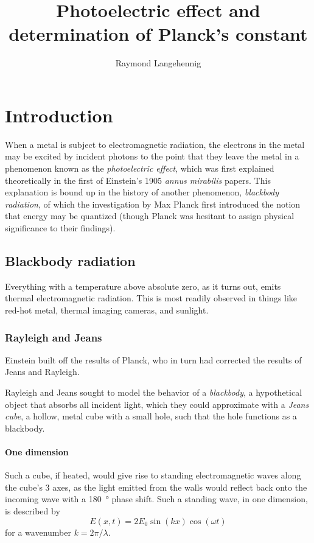 \documentclass{article}
\title{Photoelectric effect and determination of Planck's constant}
\author{Raymond Langehennig}
\begin{document}
\maketitle

\section{Introduction}
When a metal is subject to electromagnetic radiation, the electrons in the metal may be excited by incident photons to the point that they leave the metal in a phenomenon known as the \emph{photoelectric effect}, which was first explained theoretically in the first of Einstein's 1905 \textit{annus mirabilis} papers. This explanation is bound up in the history of another phenomenon, \emph{blackbody radiation}, of which the investigation by Max Planck first introduced the notion that energy may be quantized (though Planck was hesitant to assign physical significance to their findings).


\subsection{Blackbody radiation}
Everything with a temperature above absolute zero, as it turns out, emits thermal electromagnetic radiation. This is most readily observed in things like red-hot metal, thermal imaging cameras, and sunlight.

\subsubsection{Rayleigh and Jeans}
Einstein built off the results of Planck, who in turn had corrected the results of Jeans and Rayleigh.

Rayleigh and Jeans sought to model the behavior of a \emph{blackbody}, a hypothetical object that absorbs all incident light, which they could approximate with a \emph{Jeans cube}, a hollow, metal cube with a small hole, such that the hole functions as a blackbody.
\paragraph{One dimension}
Such a cube, if heated, would give rise to standing electromagnetic waves along the cube's 3 axes, as the light emitted from the walls would reflect back onto the incoming wave with a \qty{180}{\degree} phase shift. Such a standing wave, in one dimension, is described by
\begin{equation*}
    E(x,t) = 2E_0 \sin(kx)\cos(\omega t)
\end{equation*}
for a wavenumber $k=2\pi/\lambda$.
\end{document}
